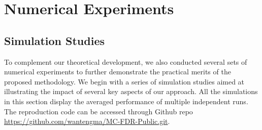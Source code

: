 \documentclass[12pt]{article}
\theoremstyle{plain}
\begin{document}
\begin{sloppypar}

\section{Numerical Experiments}\label{sec:experiments}


\subsection{Simulation Studies}
To complement our theoretical development, we also conducted several sets of numerical experiments to further demonstrate the practical merits of the proposed methodology. We begin with a series of simulation studies aimed at illustrating the impact of several key aspects of our approach. All the simulations in this section display the averaged performance of multiple independent runs.  The reproduction code can be accessed through Github repo \url{https://github.com/wantengma/MC-FDR-Public.git}.


\end{sloppypar}
\end{document}
